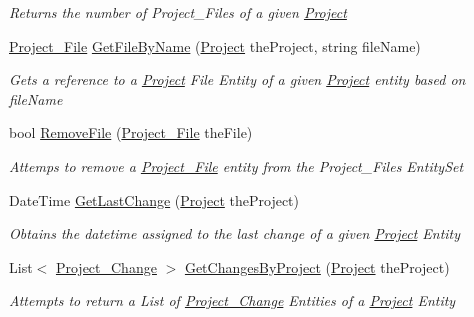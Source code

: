 \begin{DoxyCompactItemize}
\begin{DoxyCompactList}\small\item\em Returns the number of Project\-\_\-\-Files of a given \hyperlink{class_k_change_logger_1_1_project}{Project} \end{DoxyCompactList}\item 
\hyperlink{class_k_change_logger_1_1_project___file}{Project\-\_\-\-File} \hyperlink{class_k_change_logger_1_1_k_change_data_context_data_context_a801b852ef40b8c1a520daa3991eb87c4}{Get\-File\-By\-Name} (\hyperlink{class_k_change_logger_1_1_project}{Project} the\-Project, string file\-Name)
\begin{DoxyCompactList}\small\item\em Gets a reference to a \hyperlink{class_k_change_logger_1_1_project}{Project} File Entity of a given \hyperlink{class_k_change_logger_1_1_project}{Project} entity based on file\-Name \end{DoxyCompactList}\item 
bool \hyperlink{class_k_change_logger_1_1_k_change_data_context_data_context_a47e20112e74e6de15c91f025ddfc909e}{Remove\-File} (\hyperlink{class_k_change_logger_1_1_project___file}{Project\-\_\-\-File} the\-File)
\begin{DoxyCompactList}\small\item\em Attemps to remove a \hyperlink{class_k_change_logger_1_1_project___file}{Project\-\_\-\-File} entity from the Project\-\_\-\-Files Entity\-Set \end{DoxyCompactList}\item 
Date\-Time \hyperlink{class_k_change_logger_1_1_k_change_data_context_data_context_a6320cc56eb1e36a7ce73313a2215e684}{Get\-Last\-Change} (\hyperlink{class_k_change_logger_1_1_project}{Project} the\-Project)
\begin{DoxyCompactList}\small\item\em Obtains the datetime assigned to the last change of a given \hyperlink{class_k_change_logger_1_1_project}{Project} Entity \end{DoxyCompactList}\item 
List$<$ \hyperlink{class_k_change_logger_1_1_project___change}{Project\-\_\-\-Change} $>$ \hyperlink{class_k_change_logger_1_1_k_change_data_context_data_context_aa368c61c6188a7eeeff6b01e0deb5360}{Get\-Changes\-By\-Project} (\hyperlink{class_k_change_logger_1_1_project}{Project} the\-Project)
\begin{DoxyCompactList}\small\item\em Attempts to return a List of \hyperlink{class_k_change_logger_1_1_project___change}{Project\-\_\-\-Change} Entities of a \hyperlink{class_k_change_logger_1_1_project}{Project} Entity \end{DoxyCompactList}\item 

\end{DoxyCompactItemize}
